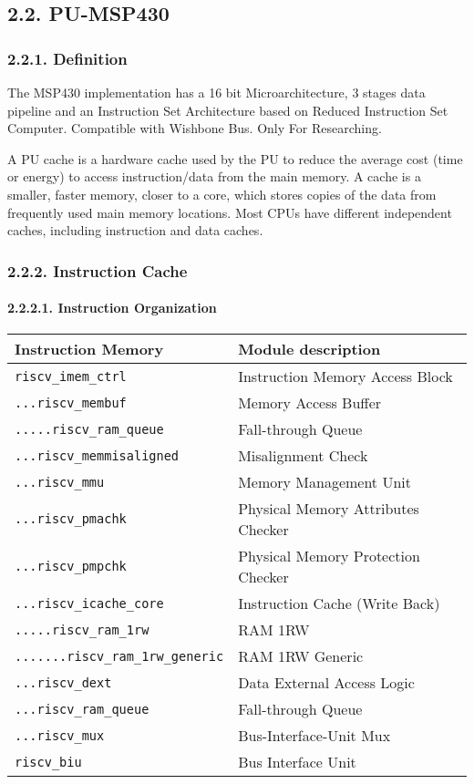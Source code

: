\documentclass[]{article}
\let\oldparagraph\paragraph
\renewcommand{\paragraph}[1]{\oldparagraph{#1}\mbox{}}
\begin{document}
\hypertarget{pu-msp430}{%
\subsection{2.2. PU-MSP430}\label{pu-msp430}}

\hypertarget{definition-1}{%
\subsubsection{2.2.1. Definition}\label{definition-1}}

The MSP430 implementation has a 16 bit Microarchitecture, 3 stages data
pipeline and an Instruction Set Architecture based on Reduced
Instruction Set Computer. Compatible with Wishbone Bus. Only For
Researching.

A PU cache is a hardware cache used by the PU to reduce the average cost
(time or energy) to access instruction/data from the main memory. A
cache is a smaller, faster memory, closer to a core, which stores copies
of the data from frequently used main memory locations. Most CPUs have
different independent caches, including instruction and data caches.

\hypertarget{instruction-cache}{%
\subsubsection{2.2.2. Instruction Cache}\label{instruction-cache}}

\hypertarget{instruction-organization}{%
\paragraph{2.2.2.1. Instruction
Organization}\label{instruction-organization}}

\begin{longtable}[]{@{}ll@{}}
\toprule
Instruction Memory & Module description\tabularnewline
\midrule
\endhead
\texttt{riscv\_imem\_ctrl} & Instruction Memory Access
Block\tabularnewline
\texttt{...riscv\_membuf} & Memory Access Buffer\tabularnewline
\texttt{.....riscv\_ram\_queue} & Fall-through Queue\tabularnewline
\texttt{...riscv\_memmisaligned} & Misalignment Check\tabularnewline
\texttt{...riscv\_mmu} & Memory Management Unit\tabularnewline
\texttt{...riscv\_pmachk} & Physical Memory Attributes
Checker\tabularnewline
\texttt{...riscv\_pmpchk} & Physical Memory Protection
Checker\tabularnewline
\texttt{...riscv\_icache\_core} & Instruction Cache (Write
Back)\tabularnewline
\texttt{.....riscv\_ram\_1rw} & RAM 1RW\tabularnewline
\texttt{.......riscv\_ram\_1rw\_generic} & RAM 1RW
Generic\tabularnewline
\texttt{...riscv\_dext} & Data External Access Logic\tabularnewline
\texttt{...riscv\_ram\_queue} & Fall-through Queue\tabularnewline
\texttt{...riscv\_mux} & Bus-Interface-Unit Mux\tabularnewline
\texttt{riscv\_biu} & Bus Interface Unit\tabularnewline
\bottomrule
\end{longtable}
\end{document}
